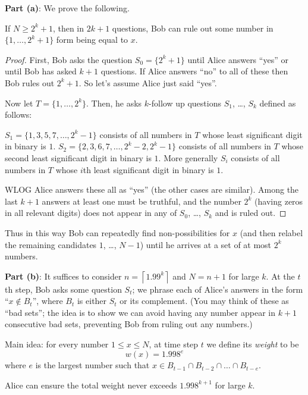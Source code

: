 \documentclass[11pt]{scrartcl}
\begin{document}
\textbf{Part (a)}: We prove the following.
\begin{claim*}
If $N \ge 2^k+1$, then in $2k+1$ questions,
Bob can rule out some number in $\{1, \dots, 2^k+1\}$
form being equal to $x$.
\end{claim*}
\begin{proof}
  First, Bob asks the question $S_0 = \{ 2^k+1 \}$
  until Alice answers ``yes''
  or until Bob has asked $k+1$ questions.
  If Alice answers ``no'' to all of these then Bob rules out $2^k+1$.
  So let's assume Alice just said ``yes''.

  Now let $T = \{1, \dots, 2^k\}$.
  Then, he asks $k$-follow up questions $S_1$, \dots, $S_k$
  defined as follows:
  \begin{itemize}
    \ii $S_1 = \{1, 3, 5, 7, \dots, 2^k-1\}$ consists of all numbers
    in $T$ whose least significant digit in binary is $1$.
    \ii $S_2 = \{ 2, 3, 6, 7, \dots, 2^k-2, 2^k-1\}$
    consists of all numbers in $T$ whose second least
    significant digit in binary is $1$.
    \ii More generally $S_i$
    consists of all numbers in $T$ whose $i$th least
    significant digit in binary is $1$.
  \end{itemize}
  WLOG Alice answers these all as ``yes'' (the other cases are similar).
  Among the last $k+1$ answers at least one must be truthful,
  and the number $2^k$ (having zeros in all relevant digits)
  does not appear in any of $S_0$, \dots, $S_k$ and is ruled out.
\end{proof}
Thus in this way Bob can repeatedly find non-possibilities for $x$
(and then relabel the remaining candidates $1$, \dots, $N-1$)
until he arrives at a set of at most $2^k$ numbers.

\textbf{Part (b)}:
It suffices to consider $n = \left\lceil 1.99^k \right\rceil$
and $N = n+1$ for large $k$.
At the $t$th step, Bob asks some question $S_t$;
we phrase each of Alice's answers in the form ``$x \notin B_t$'',
where $B_t$ is either $S_t$ or its complement.
(You may think of these as ``bad sets'';
the idea is to show we can avoid having any number
appear in $k+1$ consecutive bad sets,
preventing Bob from ruling out any numbers.)

Main idea: for every number $1 \le x \le N$,
at time step $t$ we define its \emph{weight}
to be \[ w(x) = 1.998^e \]
where $e$ is the largest number
such that $x \in B_{t-1} \cap B_{t-2} \cap \dots \cap B_{t-e}$.

\begin{claim*}
  Alice can ensure the total weight never exceeds $1.998^{k+1}$
  for large $k$.
\end{claim*}
\end{document}
